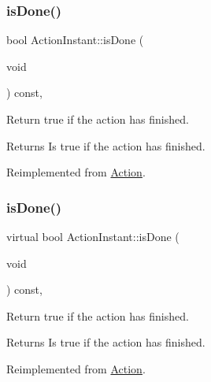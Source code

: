 \subsubsection{\texorpdfstring{is\+Done()}{isDone()}\hspace{0.1cm}{\footnotesize\ttfamily [1/2]}}
{\footnotesize\ttfamily bool Action\+Instant\+::is\+Done (\begin{DoxyParamCaption}\item[{void}]{ }\end{DoxyParamCaption}) const\hspace{0.3cm}{\ttfamily [override]}, {\ttfamily [virtual]}}

Return true if the action has finished.

\begin{DoxyReturn}{Returns}
Is true if the action has finished. 
\end{DoxyReturn}


Reimplemented from \hyperlink{classAction_a9b5dd627540a85f89f3e82acd46b7772}{Action}.

\mbox{\label{classActionInstant_a9d54eff7c6e29764843fbbb965643643}} 
\subsubsection{\texorpdfstring{is\+Done()}{isDone()}\hspace{0.1cm}{\footnotesize\ttfamily [2/2]}}
{\footnotesize\ttfamily virtual bool Action\+Instant\+::is\+Done (\begin{DoxyParamCaption}\item[{void}]{ }\end{DoxyParamCaption}) const\hspace{0.3cm}{\ttfamily [override]}, {\ttfamily [virtual]}}

Return true if the action has finished.

\begin{DoxyReturn}{Returns}
Is true if the action has finished. 
\end{DoxyReturn}


Reimplemented from \hyperlink{classAction_a9b5dd627540a85f89f3e82acd46b7772}{Action}.

\mbox{\label{classActionInstant_aeb1870802c509e1f4111c863a28e9262}} 
